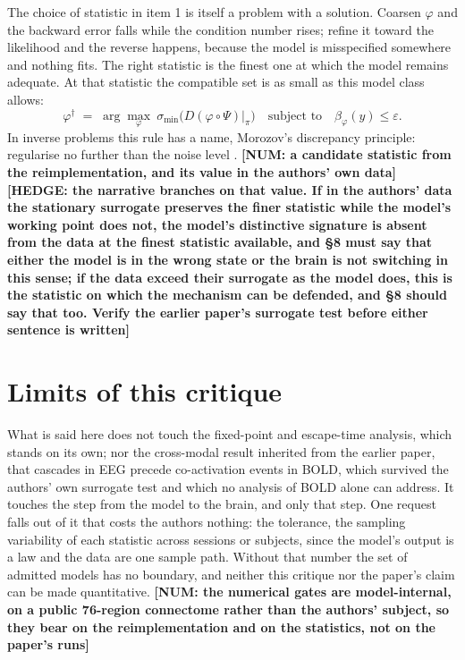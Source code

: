 \documentclass[11pt]{article}
\newcommand{\NUM}[1]{\textcolor{red!70!black}{\textbf{[NUM: #1]}}}
\newcommand{\HEDGE}[1]{\textcolor{green!40!black}{\textbf{[HEDGE: #1]}}}
\begin{document}
The choice of statistic in item 1 is itself a problem with a solution. Coarsen $\varphi$ and the backward error falls while the condition number rises; refine it toward the likelihood and the reverse happens, because the model is misspecified somewhere and nothing fits. The right statistic is the finest one at which the model remains adequate. At that statistic the compatible set is as small as this model class allows:
\begin{equation}
\varphi^{\dagger}\;=\;\arg\max_{\varphi}\ \sigma_{\min}\!\bigl(D(\varphi\circ\Psi)\big|_{\pi}\bigr)
\quad\text{subject to}\quad \beta_{\varphi}(y)\le\varepsilon .
\label{eq:design}
\end{equation}
In inverse problems this rule has a name, Morozov's discrepancy principle: regularise no further than the noise level \parencite{engl1996}. \NUM{a candidate statistic from the reimplementation, and its value in the authors' own data} \HEDGE{the narrative branches on that value. If in the authors' data the stationary surrogate preserves the finer statistic while the model's working point does not, the model's distinctive signature is absent from the data at the finest statistic available, and \S8 must say that either the model is in the wrong state or the brain is not switching in this sense; if the data exceed their surrogate as the model does, this is the statistic on which the mechanism can be defended, and \S8 should say that too. Verify the earlier paper's surrogate test before either sentence is written}

\section{Limits of this critique}
What is said here does not touch the fixed-point and escape-time analysis, which stands on its own; nor the cross-modal result inherited from the earlier paper, that cascades in EEG precede co-activation events in BOLD, which survived the authors' own surrogate test \parencite{rabuffo2021} and which no analysis of BOLD alone can address. It touches the step from the model to the brain, and only that step. One request falls out of it that costs the authors nothing: the tolerance, the sampling variability of each statistic across sessions or subjects, since the model's output is a law and the data are one sample path. Without that number the set of admitted models has no boundary, and neither this critique nor the paper's claim can be made quantitative. \NUM{the numerical gates are model-internal, on a public 76-region connectome rather than the authors' subject, so they bear on the reimplementation and on the statistics, not on the paper's runs}
\end{document}
